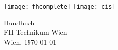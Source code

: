 %
%

\begin{titlepage}
\begin{center}

\vfill \texttt{[image: fhcomplete]}\vspace*{20mm}
\vfill \texttt{[image: cis]}
\vspace*{10mm} 

\huge Handbuch\\

	
\large \vfill FH Technikum Wien\\

Wien, \today
\end{center}
\end{titlepage}